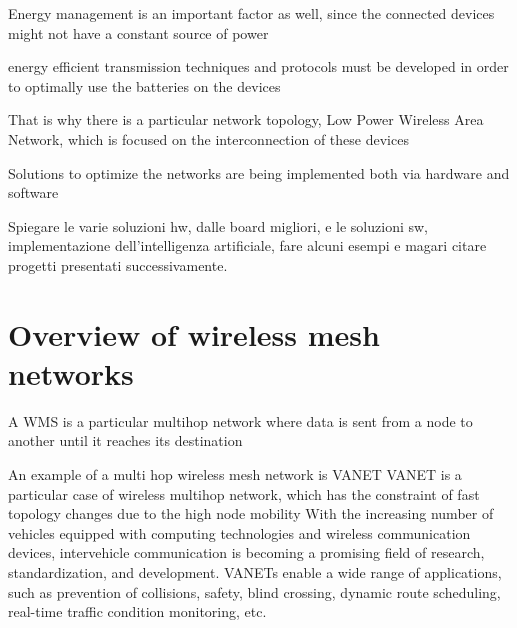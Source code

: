 		Energy management is an important factor as well, since the connected devices might not have a constant source of power
		
		energy efficient transmission techniques and protocols must be developed in order to optimally use the batteries on the devices
		
		
		That is why there is a particular network topology, Low Power Wireless Area Network, which is focused on the interconnection of these devices
	
		
		Solutions to optimize the networks are being implemented both via hardware and software
		
		Spiegare le varie soluzioni hw, dalle board migliori, e le soluzioni sw, implementazione dell'intelligenza artificiale, fare alcuni esempi e magari citare progetti presentati successivamente.
	
	\section{Overview of wireless mesh networks}
	
		A WMS is a particular multihop network where data is sent from a node to another until it reaches its destination
		
		An example of a multi hop wireless mesh network is VANET
		VANET is a particular case of wireless multihop network, which has the constraint of fast topology changes due to the high node mobility With the increasing number of vehicles equipped with computing technologies and wireless communication devices, intervehicle communication is becoming a promising field of research, standardization, and development. VANETs enable a wide range of applications, such as prevention of collisions, safety, blind crossing, dynamic route scheduling, real-time traffic condition monitoring, etc.
		\cite{BADIS2015653}
		
